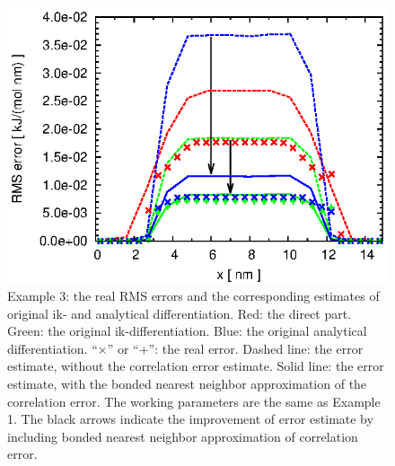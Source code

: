 \documentclass[journal=jacsat,manuscript=article]{achemso}
\newcommand{\recheck}[1]{{\color{black} #1}}
\begin{document}
\begin{figure}
  \centering
  \includegraphics[]{fig.water.orig.error.eps}
  \caption{
    Example 3: the real RMS errors and the corresponding
    estimates of original ik- and analytical differentiation.
    Red: the direct part.
    Green: the original ik-differentiation.
    Blue: the original analytical differentiation.
    ``$\times$'' or ``+'': the real error.
    Dashed line: the error estimate, without the correlation error estimate.
    Solid  line: the error estimate, with the \recheck{bonded} nearest neighbor
    approximation of the correlation error.
    The working parameters are the same as Example 1.
    The black arrows indicate the improvement
    of error estimate by including \recheck{bonded} nearest neighbor
    approximation of correlation error.
  }   
  \label{fig:water-error0}
\end{figure}
\end{document}
